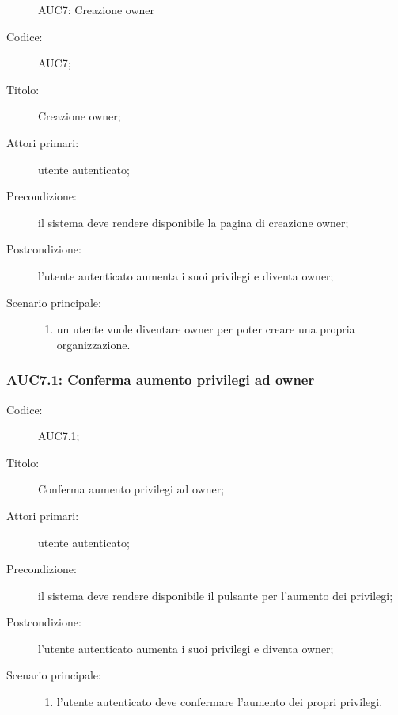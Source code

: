 \documentclass[../../../analisi-dei-requisiti.tex]{subfiles}
\begin{document}
\begin{figure}[H]
  \centering
  \caption{AUC7: Creazione owner}%
  \label{fig:AUC7}
\end{figure}

\begin{description}
  \item[Codice:] AUC7;
  \item[Titolo:] Creazione owner;
  \item[Attori primari:] utente autenticato;
  \item[Precondizione:] il sistema deve rendere disponibile la pagina di creazione owner;
  \item[Postcondizione:] l'utente autenticato aumenta i suoi privilegi e diventa owner;
  \item[Scenario principale:]
  \begin{enumerate}
    \item un utente vuole diventare owner per poter creare una propria organizzazione.
  \end{enumerate}
\end{description}

\subsubsection{AUC7.1: Conferma aumento privilegi ad owner}%
\label{subs:AUC7.1}
\begin{description}
  \item[Codice:] AUC7.1;
  \item[Titolo:] Conferma aumento privilegi ad owner;
  \item[Attori primari:] utente autenticato;
  \item[Precondizione:] il sistema deve rendere disponibile il pulsante per l'aumento dei privilegi;
  \item[Postcondizione:] l'utente autenticato aumenta i suoi privilegi e diventa owner;
  \item[Scenario principale:]
  \begin{enumerate}
    \item l'utente autenticato deve confermare l'aumento dei propri privilegi.
  \end{enumerate}
\end{description}
\end{document}
